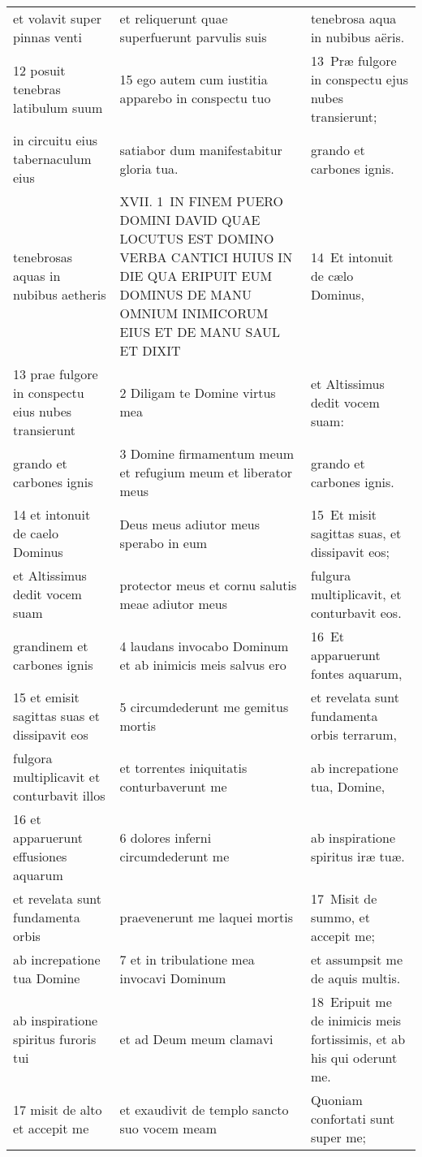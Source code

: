 \documentclass{article}
\begin{document}
\begin{longtable}{@{}p{}p{}p{}@{}}
et volavit super pinnas venti	&	et reliquerunt quae superfuerunt parvulis suis	&	tenebrosa aqua in nubibus aëris.	\\
12 posuit tenebras latibulum suum	&	15 ego autem cum iustitia apparebo in conspectu tuo	&	13 Præ fulgore in conspectu ejus nubes transierunt;	\\
in circuitu eius tabernaculum eius	&	satiabor dum manifestabitur gloria tua.	&	grando et carbones ignis.	\\
tenebrosas aquas in nubibus aetheris	&	XVII. 1 IN FINEM PUERO DOMINI DAVID QUAE LOCUTUS EST DOMINO VERBA CANTICI HUIUS IN DIE QUA ERIPUIT EUM DOMINUS DE MANU OMNIUM INIMICORUM EIUS ET DE MANU SAUL ET DIXIT	&	14 Et intonuit de cælo Dominus,	\\
13 prae fulgore in conspectu eius nubes transierunt	&	2 Diligam te Domine virtus mea	&	et Altissimus dedit vocem suam:	\\
grando et carbones ignis	&	3 Domine firmamentum meum et refugium meum et liberator meus	&	grando et carbones ignis.	\\
14 et intonuit de caelo Dominus	&	Deus meus adiutor meus sperabo in eum	&	15 Et misit sagittas suas, et dissipavit eos;	\\
et Altissimus dedit vocem suam	&	protector meus et cornu salutis meae adiutor meus	&	fulgura multiplicavit, et conturbavit eos.	\\
grandinem et carbones ignis	&	4 laudans invocabo Dominum et ab inimicis meis salvus ero	&	16 Et apparuerunt fontes aquarum,	\\
15 et emisit sagittas suas et dissipavit eos	&	5 circumdederunt me gemitus mortis	&	et revelata sunt fundamenta orbis terrarum,	\\
fulgora multiplicavit et conturbavit illos	&	et torrentes iniquitatis conturbaverunt me	&	ab increpatione tua, Domine,	\\
16 et apparuerunt effusiones aquarum	&	6 dolores inferni circumdederunt me	&	ab inspiratione spiritus iræ tuæ.	\\
et revelata sunt fundamenta orbis	&	praevenerunt me laquei mortis	&	17 Misit de summo, et accepit me;	\\
ab increpatione tua Domine	&	7 et in tribulatione mea invocavi Dominum	&	et assumpsit me de aquis multis.	\\
ab inspiratione spiritus furoris tui	&	et ad Deum meum clamavi	&	18 Eripuit me de inimicis meis fortissimis, et ab his qui oderunt me.	\\
17 misit de alto et accepit me	&	et exaudivit de templo sancto suo vocem meam	&	Quoniam confortati sunt super me;	\\

\end{longtable}
\end{document}
